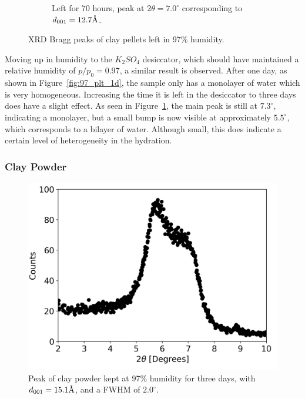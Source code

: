 \begin{figure}
\begin{subfigure}{.5\textwidth}
		\caption{Left for 70 hours, peak at $2\theta=7.0^\circ$ corresponding to $d_{001}=12.7\text{\normalfont\AA}$.}
		\label{fig:97_plt_3d}
	\end{subfigure}
	\caption{XRD Bragg peaks of clay pellets left in 97\% humidity.}
	\label{fig:97_pellet}
\end{figure}

Moving up in humidity to the $K_2SO_4$ desiccator, which should have maintained a relative humidity of $p/p_0=0.97$, a similar result is observed. After one day, as shown in Figure~\ref{fig:97_plt_1d}, the sample only has a monolayer of water which is very homogeneous. Increasing the time it is left in the desiccator to three days does have a slight effect. As seen in Figure~\ref{fig:97_plt_3d}, the main peak is still at $7.3^\circ$, indicating a monolayer, but a small bump is now visible at approximately $5.5^\circ$, which corresponds to a bilayer of water. Although small, this does indicate a certain level of heterogeneity in the hydration.


\subsubsection{Clay Powder}

\begin{figure}
	\centering
	\includegraphics[scale=0.7]{images/97_pwd_3d.png}
	\caption{Peak of clay powder kept at 97\% humidity for three days, with $d_{001}=15.1\text{\normalfont\AA}$, and a FWHM of $2.0^\circ$.}
	\label{fig:97_pwd_3d}
\end{figure}

